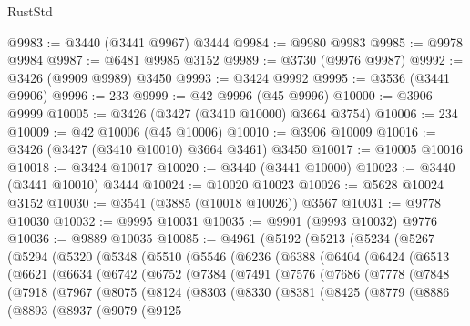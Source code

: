\begin{lexlean}{RustStd}
\begin{coremodule}
@9983 := @3440 (@3441 @9967) @3444
@9984 := @9980 @9983
@9985 := @9978 @9984
@9987 := @6481 @9985 @3152
@9989 := @3730 (@9976 @9987)
@9992 := @3426 (@9909 @9989) @3450
@9993 := @3424 @9992
@9995 := @3536 (@3441 @9906)
@9996 := 233
@9999 := @42 @9996 (@45 @9996)
@10000 := @3906 @9999
@10005 := @3426 (@3427 (@3410 @10000) @3664 @3754)
@10006 := 234
@10009 := @42 @10006 (@45 @10006)
@10010 := @3906 @10009
@10016 := @3426 (@3427 (@3410 @10010) @3664 @3461) @3450
@10017 := @10005 @10016
@10018 := @3424 @10017
@10020 := @3440 (@3441 @10000)
@10023 := @3440 (@3441 @10010) @3444
@10024 := @10020 @10023
@10026 := @5628 @10024 @3152
@10030 := @3541 (@3885 (@10018 @10026)) @3567
@10031 := @9778 @10030
@10032 := @9995 @10031
@10035 := @9901 (@9993 @10032) @9776
@10036 := @9889 @10035
@10085 := @4961
    (@5192
      (@5213
        (@5234
          (@5267
            (@5294
              (@5320
                (@5348
                  (@5510
                    (@5546
                      (@6236
                        (@6388
                          (@6404
                            (@6424
                              (@6513
                                (@6621
                                  (@6634
                                    (@6742
                                      (@6752
                                        (@7384
                                          (@7491
                                            (@7576
                                              (@7686
                                                (@7778
                                                  (@7848
                                                    (@7918
                                                      (@7967
                                                        (@8075
                                                          (@8124
                                                            (@8303
                                                              (@8330
                                                                (@8381
                                                                  (@8425
                                                                    (@8779
                                                                      (@8886
                                                                        (@8893
                                                                          (@8937
                                                                            (@9079
                                                                              (@9125

\end{coremodule}
\end{lexlean}
